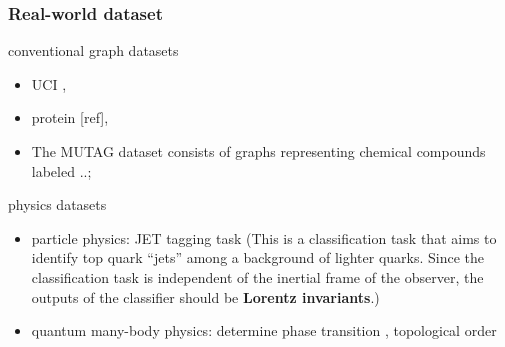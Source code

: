 \subsubsection{Real-world dataset}
conventional graph datasets
\begin{itemize}
	\item UCI \cite{kondorDiffusionKernelsGraphs2002}, 
	\item protein [ref], \cite{jumperHighlyAccurateProtein2021}
	\item The MUTAG dataset consists of graphs representing chemical compounds labeled ..;
\end{itemize}
physics datasets
\begin{itemize}
	\item particle physics: JET tagging task (This is a classification task that aims to identify top quark “jets” among a background of lighter quarks. Since the classification task is independent of the inertial frame of the observer, the outputs of the classifier should be \textbf{Lorentz invariants}.) \cite{bogatskiyLorentzGroupEquivariant2020}

	\item quantum many-body physics: determine phase transition
	\cite{carrasquillaMachineLearningPhases2017},
	topological order
	\cite{congQuantumConvolutionalNeural2019}
\end{itemize}

